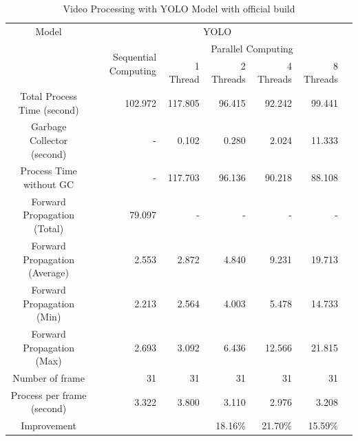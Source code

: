         \begin{table}[!htp]\centering
            \scriptsize
            \begin{tabular}{lrrrrrrr}\toprule
                \multicolumn{2}{c}{Model} &\multicolumn{5}{c}{YOLO} \\\cmidrule{1-7}
                \multicolumn{2}{c}{\multirow{2}{*}{}} &\multirow{2}{*}{Sequential Computing} &\multicolumn{4}{c}{Parallel Computing} \\\cmidrule{4-7}
                & & &1 Thread &2 Threads &4 Threads &8 Threads \\\midrule
                \multicolumn{2}{c}{Total Process Time (second)} &102.972 &117.805 &96.415 &92.242 &99.441 \\
                \multicolumn{2}{c}{Garbage Collector (second)} &- &0.102 &0.280 &2.024 &11.333 \\
                \multicolumn{2}{c}{Process Time without GC} &- &117.703 &96.136 &90.218 &88.108 \\
                \multicolumn{2}{c}{Forward Propagation (Total)} &79.097 &- &- &- &- \\
                \multicolumn{2}{c}{Forward Propagation (Average)} &2.553 &2.872 &4.840 &9.231 &19.713 \\
                \multicolumn{2}{c}{Forward Propagation (Min)} &2.213 &2.564 &4.003 &5.478 &14.733 \\
                \multicolumn{2}{c}{Forward Propagation (Max)} &2.693 &3.092 &6.436 &12.566 &21.815 \\
                \multicolumn{2}{c}{Number of frame} &31 &31 &31 &31 &31 \\
                \multicolumn{2}{c}{Process per frame (second)} &3.322 &3.800 &3.110 &2.976 &3.208 \\
                \multicolumn{2}{c}{Improvement} & & &18.16\% &21.70\% &15.59\% \\
                \bottomrule
            \end{tabular}

            \caption{Video Processing with YOLO Model with official build}\label{yolo:official-performace}
        \end{table}

